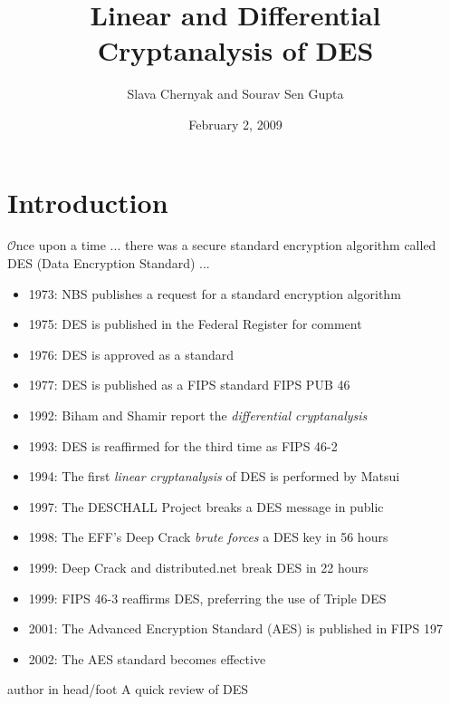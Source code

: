 \documentclass[9pt]{beamer}
\title{Linear and Differential Cryptanalysis of DES}
\author{Slava Chernyak and Sourav Sen Gupta}
\institute{University of Washington}
\date{February 2, 2009}
\begin{document}
\begin{frame}
\titlepage
\end{frame}

\section{Introduction}

\begin{frame}
\textit{\huge $\mathcal O$}nce upon a time ... \pause there was a secure standard encryption algorithm called DES (Data Encryption Standard) ...

\vspace{2mm}
\pause
\begin{itemize}[<+->]
\item{1973: NBS publishes a request for a standard encryption algorithm}
\item{1975: DES is published in the Federal Register for comment}
\item{1976: DES is approved as a standard}
\item{1977: DES is published as a FIPS standard FIPS PUB 46}
\item{1992: Biham and Shamir report the {\it differential cryptanalysis}}
\item{1993: DES is reaffirmed for the third time as FIPS 46-2}
\item{1994: The first {\it linear cryptanalysis} of DES is performed by Matsui}
\item{1997: The DESCHALL Project breaks a DES message in public}
\item{1998: The EFF's Deep Crack {\it brute forces} a DES key in 56 hours}
\item{1999: Deep Crack and distributed.net break DES in 22 hours}
\item{1999: FIPS 46-3 reaffirms DES, preferring the use of Triple DES}
\item{2001: The Advanced Encryption Standard (AES) is published in FIPS 197}
\item{2002: The AES standard becomes effective}
\end{itemize}
\end{frame}

\begin{frame}
\tableofcontents
\end{frame}

\begin{frame}
\begin{beamercolorbox}[ht=2.5ex,dp=1.125ex,center,rounded=true,shadow=true]{author in head/foot}
A quick review of DES
\end{beamercolorbox}
\end{frame}
\end{document}
